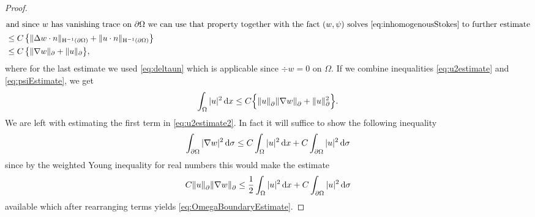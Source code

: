 \begin{proof}
\begin{align}
    \intertext{and since $w$ has vanishing trace on $\partial\Omega$ we can use that property together with the fact $(w,\psi)$ solves \eqref{eq:inhomogenousStokes} to further estimate}
    &\leq C \, \big\{ \| \Delta w \cdot n \|_{\mathrm{H}^{-1}(\partial\Omega)} + \| u \cdot n \|_{\mathrm{H}^{-1}(\partial\Omega)} \big\} \nonumber\\
    &\leq C \, \big\{ \|  \nabla w\|_\partial + \|u\|_\partial  \big\}, \label{eq:psiEstimate}
  \end{align}
  where for the last estimate we used \eqref{eq:deltaun} which is applicable since $\div w = 0$ on $\Omega$.
  If we combine inequalities \eqref{eq:u2estimate} and \eqref{eq:psiEstimate}, we get
  \begin{align}
    \int_\Omega |u|^2 \, {\operatorname{d}\!{x}} \leq C \Big\{ \|u\|^{}_\partial \|\nabla w \|^{}_\partial + \|u\|_\partial^2\Big\}. \label{eq:u2estimate2}
  \end{align}
  We are left with estimating the first term in \eqref{eq:u2estimate2}.
  In fact it will suffice to show the following inequality
  \begin{align}
    \label{eq:w2estimate}
    \int_{\partial\Omega} |\nabla w|^2 \, {\operatorname{d}\!{\sigma}} \leq C \int_\Omega |u|^2 \, {\operatorname{d}\!{x}} + C \int_{\partial\Omega} |u|^2 \, {\operatorname{d}\!{\sigma}}
  \end{align}
  since by the weighted Young inequality for real numbers this would make the estimate
  \begin{align*}
    C \| u\|^{}_\partial \|\nabla w\|^{}_\partial \leq \frac{1}{2} \int_\Omega |u|^2 \, {\operatorname{d}\!{x}} + C \int_{\partial\Omega} |u|^2 \, {\operatorname{d}\!{\sigma}}
  \end{align*}
  available which after rearranging terms yields \eqref{eq:OmegaBoundaryEstimate}.


\end{proof}

